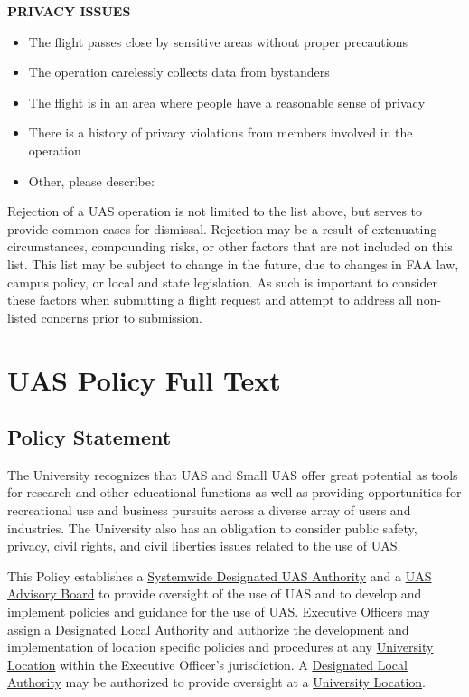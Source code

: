 \documentclass[
]{book}
\providecommand{\tightlist}{%
  \setlength{\itemsep}{0pt}\setlength{\parskip}{0pt}}
\begin{document}
\textbf{PRIVACY ISSUES}

\begin{itemize}
\tightlist
\item
  The flight passes close by sensitive areas without proper precautions
\item
  The operation carelessly collects data from bystanders
\item
  The flight is in an area where people have a reasonable sense of privacy
\item
  There is a history of privacy violations from members involved in the operation
\item
  Other, please describe:
\end{itemize}

Rejection of a UAS operation is not limited to the list above, but serves to provide common cases for dismissal. Rejection may be a result of extenuating circumstances, compounding risks, or other factors that are not included on this list. This list may be subject to change in the future, due to changes in FAA law, campus policy, or local and state legislation. As such is important to consider these factors when submitting a flight request and attempt to address all non-listed concerns prior to submission.

\hypertarget{ch-policy-full-text}{%
\chapter{UAS Policy Full Text}\label{ch-policy-full-text}}

\hypertarget{policy-statement}{%
\section{Policy Statement}\label{policy-statement}}

The University recognizes that UAS and Small UAS offer great potential as tools for research and other educational functions as well as providing opportunities for recreational use and business pursuits across a diverse array of users and industries. The University also has an obligation to consider public safety, privacy, civil rights, and civil liberties issues related to the use of UAS.

This Policy establishes a \protect\hyperlink{SDA}{Systemwide Designated UAS Authority} and a \protect\hyperlink{AB}{UAS Advisory Board} to provide oversight of the use of UAS and to develop and implement policies and guidance for the use of UAS. Executive Officers may assign a \protect\hyperlink{DLA}{Designated Local Authority} and authorize the development and implementation of location specific policies and procedures at any \protect\hyperlink{UL}{University Location} within the Executive Officer's jurisdiction. A \protect\hyperlink{DLA}{Designated Local Authority} may be authorized to provide oversight at a \protect\hyperlink{UL}{University Location}.
\end{document}
